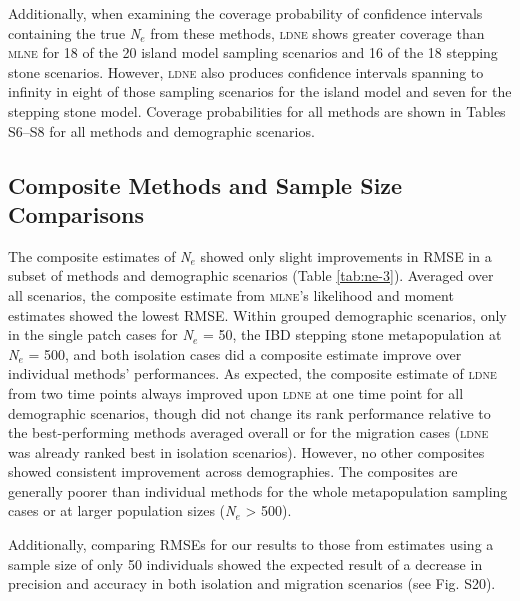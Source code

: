 Additionally, when examining the coverage probability of confidence intervals containing the true 
\emph{N}$_e$ from these methods, \textsc{ldne} shows greater coverage than \textsc{mlne} for 18 of the 20 
island model sampling scenarios and 16 of the 18 stepping stone scenarios. However, \textsc{ldne} also 
produces confidence intervals spanning to infinity in eight of those sampling scenarios for the island 
model and seven for the stepping stone model. Coverage probabilities for all methods are shown in 
Tables S6--S8 for all methods and demographic scenarios.

\subsection{Composite Methods and Sample Size Comparisons}
The composite estimates of \emph{N}$_e$ showed only slight improvements in RMSE in a subset of 
methods and demographic scenarios (Table \ref{tab:ne-3}). Averaged over all scenarios, the composite estimate from 
\textsc{mlne}'s likelihood and moment estimates showed the lowest RMSE. Within grouped demographic 
scenarios, only in the single patch cases for \emph{N}$_e$ = 50, the IBD stepping stone metapopulation 
at \emph{N}$_e$ = 500, and both isolation cases did a composite estimate improve over individual methods' 
performances. As expected, the composite estimate of \textsc{ldne} from two time points always improved upon 
\textsc{ldne} at one time point for all demographic scenarios, though did not change its rank performance 
relative to the best-performing methods averaged overall or for the migration cases (\textsc{ldne} was 
already ranked best in isolation scenarios). However, no other composites showed consistent improvement 
across demographies. The composites are generally poorer than individual methods for the whole 
metapopulation sampling cases or at larger population sizes (\emph{N}$_e$ > 500).

Additionally, comparing RMSEs for our results to those from estimates using a sample size of only 50 
individuals showed the expected result of a decrease in precision and accuracy in both isolation and 
migration scenarios (see Fig. S20).



